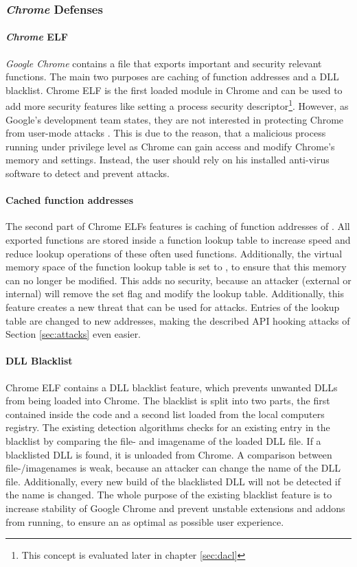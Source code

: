\subsubsection{\emph{Chrome} Defenses}
\paragraph{\emph{Chrome} ELF}
\emph{Google Chrome} contains a  file that exports important and security relevant functions. The main two purposes are caching of function addresses and a \gls{DLL} blacklist. Chrome ELF is the first loaded module in Chrome and can be used to add more security features like setting a process security descriptor\footnote{This concept is evaluated later in chapter \ref{sec:dacl}}. However, as Google's development team states, they are not interested in protecting Chrome from user-mode attacks \cite{chromium_security}. This is due to the reason, that a malicious process running under privilege level as Chrome can gain access and modify Chrome's memory and settings. Instead, the user should rely on his installed anti-virus software to detect and prevent attacks.

\paragraph{Cached function addresses}
The second part of Chrome ELFs features is caching of function addresses of . All exported functions are stored inside a function lookup table to increase speed and reduce lookup operations of these often used functions. Additionally, the virtual memory space of the function lookup table is set to , to ensure that this memory can no longer be modified. This adds no security, because an attacker (external or internal) will remove the set  flag and modify the lookup table. Additionally, this feature creates a new threat that can be used for attacks. Entries of the lookup table are changed to new addresses, making the described \gls{API} hooking attacks of Section \ref{sec:attacks} even easier.

\paragraph{DLL Blacklist}
Chrome ELF contains a \gls{DLL} blacklist feature, which prevents unwanted \glspl{DLL} from being loaded into Chrome. The blacklist is split into two parts, the first contained inside the code and a second list loaded from the local computers registry. The existing detection algorithms checks for an existing entry in the blacklist by comparing the file- and imagename of the loaded \gls{DLL} file. If a blacklisted \gls{DLL} is found, it is unloaded from Chrome. A comparison between file-/imagenames is  weak, because an attacker can change the name of the \gls{DLL} file. Additionally, every new build of the blacklisted \gls{DLL} will not be detected if the name is changed. The whole purpose of the existing blacklist feature is to increase stability of Google Chrome and prevent unstable extensions and addons from running, to ensure an as optimal as possible user experience.